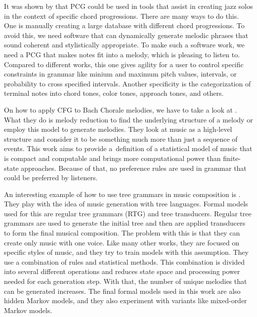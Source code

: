 It was shown by \cite{gramimprovisation} that PCG could be used in tools that assist in creating jazz solos in the context of specific chord progressions. There are many ways to do this. One is manually creating a large database with different chord progressions. To avoid this, we need software that can dynamically generate melodic phrases that sound coherent and stylistically appropriate. To make such a software work, we need a PCG that makes notes fit into a melody, which is pleasing to listen to. Compared to different works, this one gives agility for a user to control specific constraints in grammar like minium and maximum pitch values, intervals, or probability to cross specified intervals. Another specificity is the categorization of terminal notes into chord tones, color tones, approach tones, and others.

On how to apply CFG to Bach Chorale melodies, we have to take a look at \cite{probmelodyreduction}. What they do is melody reduction to find the underlying structure of a melody or employ this model to generate melodies. They look at music as a high-level structure and consider it to be something much more than just a sequence of events. This work aims to provide a~definition of a statistical model of music that is compact and computable and brings more computational power than finite-state approaches. Because of that, no preference rules are used in grammar that could be preferred by listeners.

An interesting example of how to use tree grammars in music composition is \cite{africathesis}. They play with the idea of music generation with tree languages. Formal models used for this are regular tree grammars (RTG) and tree transducers. Regular tree grammars are used to generate the initial tree and then are applied transducers to form the final musical composition. The problem with this is that they can create only music with one voice. Like many other works, they are focused on specific styles of music, and they try to train models with this assumption. They use a combination of rules and statistical methods. This combination is divided into several different operations and reduces state space and processing power needed for each generation step. With that, the number of unique melodies that can be generated increases. The final formal models used in this work are also hidden Markov models, and they also experiment with variants like mixed-order Markov models.

